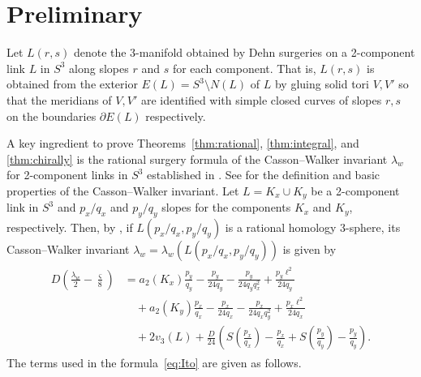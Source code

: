 \documentclass{amsart}
\theoremstyle{remark}
\begin{document}
\section{Preliminary}\label{sec:preliminary}

Let $L(r,s)$ denote the 3-manifold obtained by Dehn surgeries on a 2-component link $L$ in $S^3$ along slopes $r$ and $s$ for each component. 
That is, $L(r,s)$ is obtained from the exterior $E(L) = S^3 \setminus N(L)$ of $L$ by gluing solid tori $V, V'$ so that the meridians of $V, V'$ are identified with simple closed curves of slopes $r,s$ on the boundaries $\partial E(L)$ respectively.  

A key ingredient to prove Theorems~\ref{thm:rational}, \ref{thm:integral}, and \ref{thm:chirally} is the rational surgery formula of the Casson--Walker invariant $\lambda_w$ for 2-component links in $S^3$ established in \cite[Theorem 1.5]{Ito2022}. 
See \cite{Walker} for the definition and basic properties of the Casson--Walker invariant. 
Let $L=K_x \cup K_y$ be a 2-component link in $S^3$ and $p_x / q_x$ and $p_y / q_y$ slopes for the components $K_x$ and $K_y$, respectively. 
Then, by \cite[Theorem 1.5]{Ito2022}, if $L(p_x / q_x, p_y / q_y)$ is a rational homology 3-sphere, its Casson--Walker invariant $\lambda_w=\lambda_w(L(p_x / q_x, p_y / q_y))$ is given by 
\begin{align}\label{eq:Ito}
\begin{split}
D \left(\frac{\lambda_w}{2}-\frac{\varsigma}{8}\right) &= a_2(K_x)\frac{p_y}{q_y}-\frac{p_y}{24q_y} -\frac{p_y}{24q_yq_x^2} +\frac{p_y\ell^2}{24q_y}\\
&\quad +a_2(K_y)\frac{p_x}{q_x} -\frac{p_x}{24q_x}-\frac{p_x}{24q_xq_y^2}+\frac{p_x\ell^2}{24q_x}\\
&\quad + 2v_3(L) + \frac{D}{24}\left( S\left(\frac{p_x}{q_x}\right)-\frac{p_x}{q_x} +S\left(\frac{p_y}{q_y}\right)-\frac{p_y}{q_y} \right).
\end{split}
\end{align}
The terms used in the formula~\eqref{eq:Ito} are given as follows. 
\end{document}
